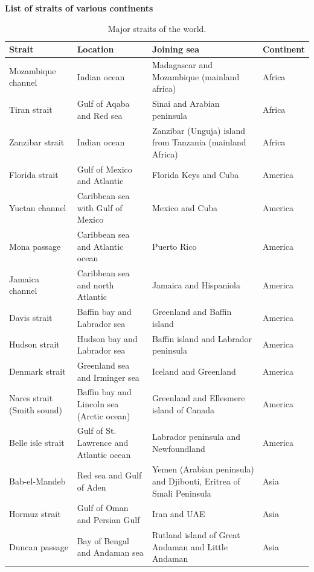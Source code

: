 \documentclass[
  openany]{book}
\begin{document}
\textbf{List of straits of various continents}

\begin{longtable}[t]{>{\raggedright\arraybackslash}p{8em}>{\raggedright\arraybackslash}p{12em}>{\raggedright\arraybackslash}p{12em}>{\raggedright\arraybackslash}p{5em}}
\caption{\label{tab:world-straits}Major straits of the world.}\\
\toprule
Strait & Location & Joining sea & Continent\\
\midrule
\rowcolor{gray!6}  Mozambique channel & Indian ocean & Madagascar and Mozambique (mainland africa) & Africa\\
Tiran strait & Gulf of Aqaba and Red sea & Sinai and Arabian peninsula & Africa\\
\rowcolor{gray!6}  Zanzibar strait & Indian ocean & Zanzibar (Unguja) island from Tanzania (mainland Africa) & Africa\\
Florida strait & Gulf of Mexico and Atlantic & Florida Keys and Cuba & America\\
\rowcolor{gray!6}  Yuctan channel & Caribbean sea with Gulf of Mexico & Mexico and Cuba & America\\
\addlinespace
Mona passage & Caribbean sea and Atlantic ocean & Puerto Rico & America\\
\rowcolor{gray!6}  Jamaica channel & Caribbean sea and north Atlantic & Jamaica and Hispaniola & America\\
Davis strait & Baffin bay and Labrador sea & Greenland and Baffin island & America\\
\rowcolor{gray!6}  Hudson strait & Hudson bay and Labrador sea & Baffin island and Labrador peninsula & America\\
Denmark strait & Greenland sea and Irminger sea & Iceland and Greenland & America\\
\addlinespace
\rowcolor{gray!6}  Nares strait (Smith sound) & Baffin bay and Lincoln sea (Arctic ocean) & Greenland and Ellesmere island of Canada & America\\
Belle isle strait & Gulf of St. Lawrence and Atlantic ocean & Labrador peninsula and Newfoundland & America\\
\rowcolor{gray!6}  Bab-el-Mandeb & Red sea and Gulf of Aden & Yemen (Arabian peninsula) and Djibouti, Eritrea of Smali Peninsula & Asia\\
Hormuz strait & Gulf of Oman and Persian Gulf & Iran and UAE & Asia\\
\rowcolor{gray!6}  Duncan passage & Bay of Bengal and Andaman sea & Rutland island of Great Andaman and Little Andaman & Asia\\

\end{longtable}
\end{document}
